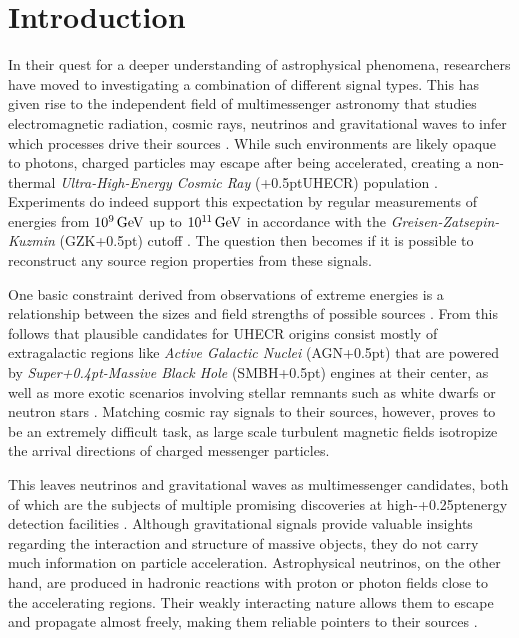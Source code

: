 \chapter{Introduction}
\label{ch:introduction}

In their quest for a deeper understanding of astrophysical phenomena, researchers have moved to investigating
a combination of different signal types. This has given rise to the independent field of multimessenger astronomy
that studies electromagnetic radiation, cosmic rays, neutrinos and gravitational waves to infer which processes
drive their sources \cite{Meszaros_2019}. While such environments are likely opaque to photons, charged
particles may escape after being accelerated, creating a non-thermal \emph{Ultra-High-Energy Cosmic Ray}
({\kern+0.5pt}UHECR) population \cite{Becker_2008}. Experiments do indeed support this expectation by regular
measurements of energies from $10^{9}{\kern+1.5pt}\unit{\giga\electronvolt}$ up to
$10^{1{\kern-0.3pt}1}{\kern+1.5pt}\unit{\giga\electronvolt}$ in accordance with the
\emph{Greisen-Zatsepin-Kuzmin} (GZK{\kern+0.5pt}) cutoff \cite{pa}. The question then
becomes if it is possible to reconstruct any source region properties from these signals.

One basic constraint derived from observations of extreme energies is a relationship between the sizes and field
strengths of possible sources \cite{Hillas_1984}. From this follows that plausible candidates for UHECR origins
consist mostly of extragalactic regions like \emph{Active Galactic Nuclei} (AGN{\kern+0.5pt}) that are powered
by \emph{Super{\kern+0.4pt}-Massive Black Hole} (SMBH{\kern+0.5pt}) engines at their center, as well as more exotic
scenarios involving stellar remnants such as white dwarfs or neutron stars \cite{Tjus_2020, Gabici_2019, Drury_2012}.
Matching cosmic ray signals to their sources, however, proves to be an extremely difficult task, as large scale
turbulent magnetic fields isotropize the arrival directions of charged messenger particles.

This leaves neutrinos and gravitational waves as multimessenger candidates, both of which are the subjects of multiple
promising discoveries at high-{\kern+0.25pt}energy detection facilities \cite{ic_first_evidence, ic_more_evidence, ligo}.
Although gravitational signals provide valuable insights regarding the interaction and structure of massive objects,
they do not carry much information on particle acceleration. Astrophysical neutrinos, on the other hand, are produced
in hadronic reactions with proton or photon fields close to the accelerating regions. Their weakly interacting nature
allows them to escape and propagate almost freely, making them reliable pointers to their sources \cite{Becker_2008}.

